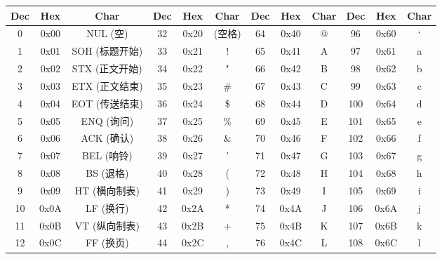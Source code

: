 \documentclass[a4paper, twoside]{article}
\begin{document}
\begin{table}[h]
    \centering
    \renewcommand{\arraystretch}{1.4}
    \setlength{\tabcolsep}{5pt}
    \begin{tabular}{|c c c|c c c|c c c|c c c|}
        \hline
        \textbf{Dec} & \textbf{Hex} & \textbf{Char} & \textbf{Dec} & \textbf{Hex} & \textbf{Char} & \textbf{Dec} & \textbf{Hex} & \textbf{Char} & \textbf{Dec} & \textbf{Hex} & \textbf{Char} \\
        \hline
            0  & 0x00 & NUL (空)          & 32  & 0x20 & (空格)     & 64  & 0x40 & @           &  96  & 0x60 & `            \\
            1  & 0x01 & SOH (标题开始)    & 33  & 0x21 & !          & 65  & 0x41 & A           &  97  & 0x61 & a            \\
            2  & 0x02 & STX (正文开始)    & 34  & 0x22 & "          & 66  & 0x42 & B           &  98  & 0x62 & b            \\
            3  & 0x03 & ETX (正文结束)    & 35  & 0x23 & \#         & 67  & 0x43 & C           &  99  & 0x63 & c            \\
            4  & 0x04 & EOT (传送结束)    & 36  & 0x24 & \$         & 68  & 0x44 & D           & 100  & 0x64 & d            \\
            5  & 0x05 & ENQ (询问)        & 37  & 0x25 & \%         & 69  & 0x45 & E           & 101  & 0x65 & e            \\
            6  & 0x06 & ACK (确认)        & 38  & 0x26 & \&         & 70  & 0x46 & F           & 102  & 0x66 & f            \\
            7  & 0x07 & BEL (响铃)        & 39  & 0x27 & '          & 71  & 0x47 & G           & 103  & 0x67 & g            \\
            8  & 0x08 & BS (退格)         & 40  & 0x28 & (          & 72  & 0x48 & H           & 104  & 0x68 & h            \\
            9  & 0x09 & HT (横向制表)     & 41  & 0x29 & )          & 73  & 0x49 & I           & 105  & 0x69 & i            \\
        10  & 0x0A & LF (换行)         & 42  & 0x2A & *          & 74  & 0x4A & J           & 106  & 0x6A & j            \\
        11  & 0x0B & VT (纵向制表)     & 43  & 0x2B & +          & 75  & 0x4B & K           & 107  & 0x6B & k            \\
        12  & 0x0C & FF (换页)         & 44  & 0x2C & ,          & 76  & 0x4C & L           & 108  & 0x6C & l            \\

\end{tabular}
\end{table}
\end{document}
